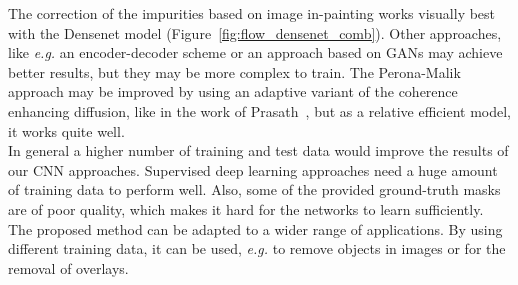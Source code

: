 The correction of the impurities based on image in-painting works visually best with the Densenet model (Figure~\ref{fig:flow_densenet_comb}). Other approaches, like \textit{e.g.} an encoder-decoder scheme or an approach based on GANs may achieve better results, but they may be more complex to train. The Perona-Malik approach may be improved by using an adaptive variant of the coherence enhancing diffusion, like in the work of Prasath~\cite{Prasath16}, but as a relative efficient model, it works quite well.\\

In general a higher number of training and test data would improve the results of our CNN approaches. Supervised deep learning approaches need a huge amount of training data to perform well. Also, some of the provided ground-truth masks are of poor quality, which makes it hard for the networks to learn sufficiently. \\

The proposed method can be adapted to a wider range of applications. By using different training data, it can be used, \textit{e.g.} to remove objects in images or for the removal of overlays.



\newpage
\label{sect:bib}






